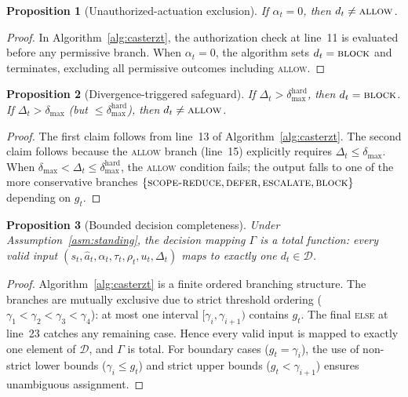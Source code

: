 \documentclass[10pt,journal,compsoc]{IEEEtran}
\newtheorem{proposition}{Proposition}
\begin{document}
\begin{proposition}[Unauthorized-actuation exclusion]
\label{prop:authz}
If $\alpha_t = 0$, then $d_t \neq \textsc{allow}$.
\end{proposition}
\begin{proof}
In Algorithm~\ref{alg:casterzt}, the authorization check at line~11 is evaluated before any permissive branch.
When $\alpha_t=0$, the algorithm sets $d_t = \textsc{block}$ and terminates, excluding all permissive outcomes including \textsc{allow}.
\end{proof}

\begin{proposition}[Divergence-triggered safeguard]
\label{prop:divergence}
If $\Delta_t > \delta_{\max}^{\mathrm{hard}}$, then $d_t = \textsc{block}$.
If $\Delta_t > \delta_{\max}$ (but $\le \delta_{\max}^{\mathrm{hard}}$), then $d_t \neq \textsc{allow}$.
\end{proposition}
\begin{proof}
The first claim follows from line~13 of Algorithm~\ref{alg:casterzt}.
The second claim follows because the \textsc{allow} branch (line~15) explicitly requires $\Delta_t \le \delta_{\max}$.
When $\delta_{\max} < \Delta_t \le \delta_{\max}^{\mathrm{hard}}$, the \textsc{allow} condition fails; the output falls to one of the more conservative branches $\{\textsc{scope-reduce}, \textsc{defer}, \textsc{escalate}, \textsc{block}\}$ depending on $g_t$.
\end{proof}

\begin{proposition}[Bounded decision completeness]
\label{prop:completeness}
Under Assumption~\ref{asm:standing}, the decision mapping $\Gamma$ is a total function: every valid input $(s_t, \hat{a}_t, \alpha_t, \tau_t, \rho_t, u_t, \Delta_t)$ maps to exactly one $d_t \in \mathcal{D}$.
\end{proposition}
\begin{proof}
Algorithm~\ref{alg:casterzt} is a finite ordered branching structure.
The branches are mutually exclusive due to strict threshold ordering ($\gamma_1 < \gamma_2 < \gamma_3 < \gamma_4$): at most one interval $[\gamma_i, \gamma_{i+1})$ contains $g_t$.
The final \textsc{else} at line~23 catches any remaining case.
Hence every valid input is mapped to exactly one element of $\mathcal{D}$, and $\Gamma$ is total.
For boundary cases ($g_t = \gamma_i$), the use of non-strict lower bounds ($\gamma_i \le g_t$) and strict upper bounds ($g_t < \gamma_{i+1}$) ensures unambiguous assignment.
\end{proof}
\end{document}
